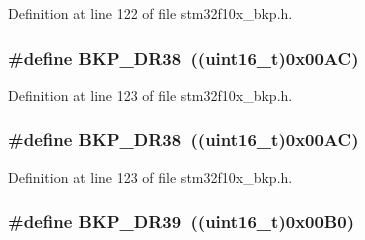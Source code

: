 Definition at line 122 of file stm32f10x\+\_\+bkp.\+h.

\subsubsection[{\texorpdfstring{B\+K\+P\+\_\+\+D\+R38}{BKP_DR38}}]{\setlength{\rightskip}{0pt plus 5cm}\#define B\+K\+P\+\_\+\+D\+R38~(({\bf uint16\+\_\+t})0x00\+A\+C)}\hypertarget{group___data___backup___register_ga88f4c7dd39ba83b66159b2c808275a09}{}\label{group___data___backup___register_ga88f4c7dd39ba83b66159b2c808275a09}


Definition at line 123 of file stm32f10x\+\_\+bkp.\+h.

\subsubsection[{\texorpdfstring{B\+K\+P\+\_\+\+D\+R38}{BKP_DR38}}]{\setlength{\rightskip}{0pt plus 5cm}\#define B\+K\+P\+\_\+\+D\+R38~(({\bf uint16\+\_\+t})0x00\+A\+C)}\hypertarget{group___data___backup___register_ga88f4c7dd39ba83b66159b2c808275a09}{}\label{group___data___backup___register_ga88f4c7dd39ba83b66159b2c808275a09}


Definition at line 123 of file stm32f10x\+\_\+bkp.\+h.

\subsubsection[{\texorpdfstring{B\+K\+P\+\_\+\+D\+R39}{BKP_DR39}}]{\setlength{\rightskip}{0pt plus 5cm}\#define B\+K\+P\+\_\+\+D\+R39~(({\bf uint16\+\_\+t})0x00\+B0)}\hypertarget{group___data___backup___register_ga1656f56588b474b1f48bb96380cdfd4a}{}\label{group___data___backup___register_ga1656f56588b474b1f48bb96380cdfd4a}


